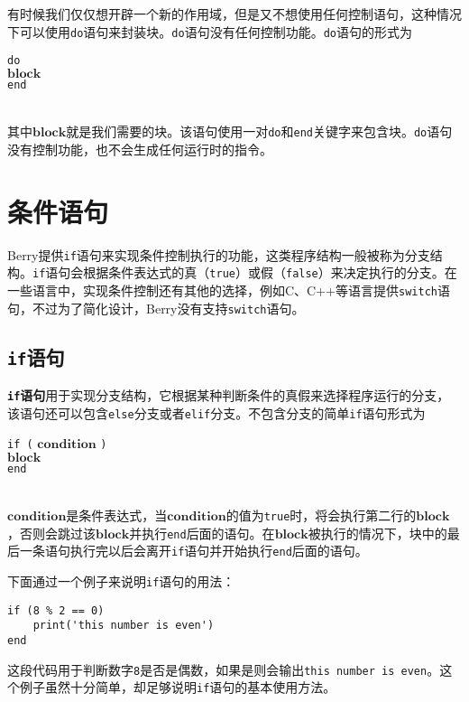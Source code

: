 有时候我们仅仅想开辟一个新的作用域，但是又不想使用任何控制语句，这种情况下可以使用\texttt{do}语句来封装块。\texttt{do}语句没有任何控制功能。\texttt{do}语句的形式为
\begin{algorithm}
    \texttt{do}\\
    \qquad $\bm{block}$ \\
    \texttt{end}
\end{algorithm}\vspace{-0.6em}\\
其中$\bm{block}$就是我们需要的块。该语句使用一对\texttt{do}和\texttt{end}关键字来包含块。\texttt{do}语句没有控制功能，也不会生成任何运行时的指令。

\section{条件语句}

Berry提供\texttt{if}语句来实现条件控制执行的功能，这类程序结构一般被称为分支结构。\texttt{if}语句会根据条件表达式的真（\texttt{true}）或假（\texttt{false}）来决定执行的分支。在一些语言中，实现条件控制还有其他的选择，例如C、C++等语言提供\texttt{switch}语句，不过为了简化设计，Berry没有支持\texttt{switch}语句。

\subsection{\texttt{if}语句}

\textbf{\texttt{if}语句}用于实现分支结构，它根据某种判断条件的真假来选择程序运行的分支，该语句还可以包含\texttt{else}分支或者\texttt{elif}分支。不包含分支的简单\texttt{if}语句形式为
\begin{algorithm}
    \texttt{if (} $\bm{condition}$ \texttt{)} \\
    \qquad $\bm{block}$ \\
    \texttt{end}
\end{algorithm}\vspace{-0.6em}\\
$\bm{condition}$是条件表达式，当$\bm{condition}$的值为\texttt{true}时，将会执行第二行的$\bm{block}$，否则会跳过该$\bm{block}$并执行\texttt{end}后面的语句。在$\bm{block}$被执行的情况下，块中的最后一条语句执行完以后会离开\texttt{if}语句并开始执行\texttt{end}后面的语句。

下面通过一个例子来说明\texttt{if}语句的用法：
\begin{lstlisting}[language=berry, numbers=none]
if (8 % 2 == 0)
    print('this number is even')
end
\end{lstlisting}
这段代码用于判断数字\texttt{8}是否是偶数，如果是则会输出\texttt{this number is even}。这个例子虽然十分简单，却足够说明\texttt{if}语句的基本使用方法。

